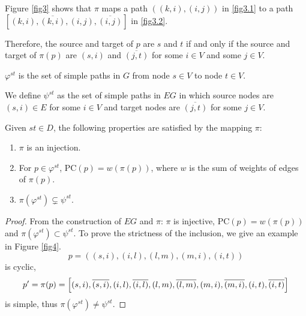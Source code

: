 Figure \eqref{fig3} shows that \(\pi\) maps a path \(\left( (k,i), (i,j) \right)\) in \eqref{fig3.1} to a path \(\left[(k,i), \overline{(k,i)}, (i,j),  \overline{(i,j)} \right]\) in \eqref{fig3.2}.

Therefore, the source and target of \(p\) are \(s\) and \(t\) if and only if  the source and target of \(\pi(p)\) are \((s, i)\) and \(\overline{(j,t)}\) for some \(i \in V\) and  some \(j \in V\).

 \(\varphi^{st}\) is the set of simple paths in \(G\) from node \(s \in V\) to node \(t \in V\).
 
 We define \(\psi^{st}\) as the set of simple paths in \(EG\) in which source nodes are \((s, i) \in E\) for some \(i \in V\) and target nodes are \(\overline{(j,t)}\) for some \(j \in V\).
\begin{lemma}
Given $st \in D$, the following properties are satisfied by the mapping \(\pi\):
\begin{enumerate}
    \item \(\pi\) is an injection.
    \item For \(p \in \varphi^{st}\), \(\textrm{PC}(p) = w(\pi(p))\), where \(w\) is the sum of weights of edges of \(\pi(p)\).
    \item \(\pi( \varphi^{st})  \subsetneq \psi^{st} \).
\end{enumerate}
\end{lemma}
\begin{proof}
From the construction of \(EG\) and \(\pi\): \(\pi\) is injective, \(\textrm{PC}(p) = w\left(\pi(p)\right)\) and \(\pi( \varphi^{st})  \subset \psi^{st} \). To prove the strictness of the inclusion, we give an example in Figure \eqref{fig4}.
\begin{equation*}
p = \left((s,i), (i,l), (l,m),(m,i),(i,t) \right)
\end{equation*}
is cyclic,
\begin{equation*}
p' = \pi(p) = \left[(s,i),\overline{(s,i)},(i,l),\overline{(i,l)},\\(l,m),\overline{(l,m)},(m,i), \overline{(m,i)},(i,t), \overline{(i,t)}\right]
\end{equation*}
is simple, thus  \(\pi( \varphi^{st})  \ne \psi^{st} \).
\end{proof}

